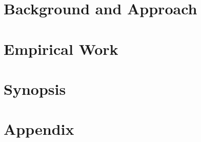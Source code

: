 \documentclass[ a4paper,titlepage,numbers=noenddot,headinclude,%
                footinclude=true,cleardoublepage=empty,abstractoff,
                BCOR=5mm,paper=a4,fontsize=11pt,
                british
                ]{scrreprt}
\begin{document}
\frenchspacing
\raggedbottom
{} %
\pagestyle{plain}




\ifdrafting
\else
    \cleardoublepage
    \cleardoublepage
\fi
\cleardoublepage
\pagestyle{scrheadings}
\cleardoublepage


\cleardoublepage{}
\cleardoublepage


\cleardoublepage
\part{Background and Approach}\label{part:background}



\cleardoublepage
\part{Empirical Work}\label{part:empirical}




\cleardoublepage
\part{Synopsis}\label{part:synopsis}




\appendix
\renewcommand{\thechapter}{\Alph{chapter}}
\cleardoublepage
\part{Appendix}\label{part:appendix}









\cleardoublepage
\cleardoublepage
\cleardoublepage

\end{document}
